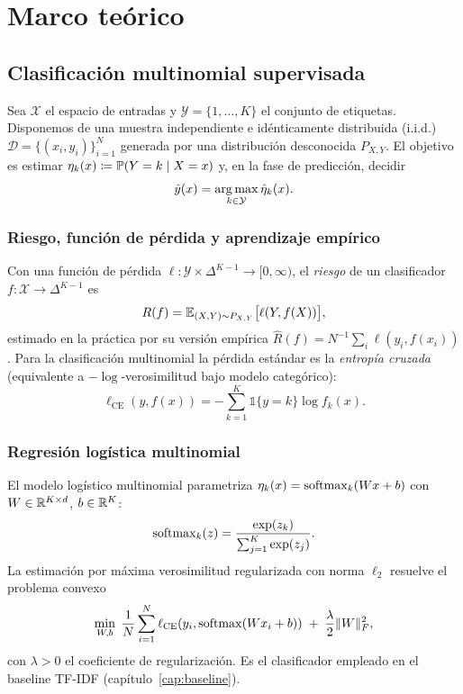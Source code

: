 \chapter{Marco teórico}\label{cap:marco-teorico}

\section{Clasificación multinomial supervisada}

Sea $\mathcal{X}$ el espacio de entradas y $\mathcal{Y} = \{1, \dots, K\}$
el conjunto de etiquetas. Disponemos de una muestra independiente e
idénticamente distribuida (i.i.d.)
$\mathcal{D} = \{(x_i, y_i)\}_{i=1}^N$ generada por una distribución
desconocida $P_{X,Y}$. El objetivo es estimar
$\eta_k(x) \coloneqq \mathbb{P}(Y = k \mid X = x)$ y, en la fase de
predicción, decidir
\[
  \hat{y}(x) = \operatorname*{arg\,max}_{k \in \mathcal{Y}} \hat{\eta}_k(x).
\]

\subsection{Riesgo, función de pérdida y aprendizaje empírico}

Con una función de pérdida $\ell : \mathcal{Y} \times \Delta^{K-1} \to
[0, \infty)$, el \emph{riesgo} de un clasificador
$f : \mathcal{X} \to \Delta^{K-1}$ es
\[
  R(f) = \mathbb{E}_{(X,Y) \sim P_{X,Y}} \bigl[ \ell(Y, f(X)) \bigr],
\]
estimado en la práctica por su versión empírica
$\hat{R}(f) = N^{-1} \sum_i \ell(y_i, f(x_i))$. Para la clasificación
multinomial la pérdida estándar es la \emph{entropía cruzada}
(equivalente a $-\log$-verosimilitud bajo modelo categórico):
\[
  \ell_{\text{CE}}(y, f(x)) = -\sum_{k=1}^K \mathbb{1}\{y = k\}
  \log f_k(x).
\]

\subsection{Regresión logística multinomial}

El modelo logístico multinomial parametriza
$\eta_k(x) = \operatorname{softmax}_k(W x + b)$ con
$W \in \mathbb{R}^{K \times d}$, $b \in \mathbb{R}^K$:
\[
  \operatorname{softmax}_k(z) = \frac{\exp(z_k)}{\sum_{j=1}^K \exp(z_j)}.
\]
La estimación por máxima verosimilitud regularizada con norma $\ell_2$
resuelve el problema convexo
\[
  \min_{W, b}\;
  \frac{1}{N} \sum_{i=1}^N \ell_{\text{CE}}(y_i, \operatorname{softmax}(W x_i + b))
  \;+\; \frac{\lambda}{2} \lVert W \rVert_F^2,
\]
con $\lambda > 0$ el coeficiente de regularización. Es el clasificador
empleado en el baseline TF-IDF (capítulo~\ref{cap:baseline}).

